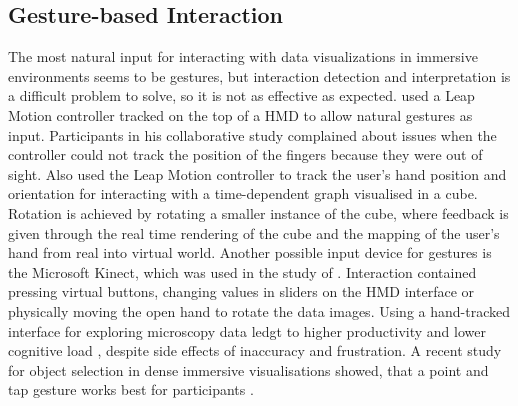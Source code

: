 \subsection{Gesture-based Interaction}
\label{subsection:Gesture-based Interaction}
The most natural input for interacting with data visualizations in immersive environments seems to be gestures, but interaction detection and interpretation is a difficult problem to solve, so it is not as effective as expected.\newline
\cite{Cordeil2017b} used a Leap Motion controller tracked on the top of a \ac{HMD} to allow natural gestures as input. Participants in his collaborative study complained about issues when the controller could not track the position of the fingers because they were out of sight.\newline
Also \cite{Clarke2016} used the Leap Motion controller to track the user's hand position and orientation for interacting with a time-dependent graph visualised in a cube. Rotation is achieved by rotating a smaller instance of the cube, where feedback is given through the real time rendering of the cube and the mapping of the user's hand from real into virtual world.\newline
Another possible input device for gestures is the Microsoft Kinect, which was used in the study of \cite{Nagao2017}. Interaction contained pressing virtual buttons, changing values in sliders on the \ac{HMD} interface or physically moving the open hand to rotate the data images.\newline
Using a hand-tracked interface for exploring microscopy data ledgt to higher productivity \autocite[]{Theart2017} and lower cognitive load \autocite[]{Filho2020}, despite side effects of inaccuracy and frustration. 
A recent study for object selection in dense immersive visualisations showed, that a point and tap gesture works best for participants \autocite[]{Bhowmick2021}. \newline

